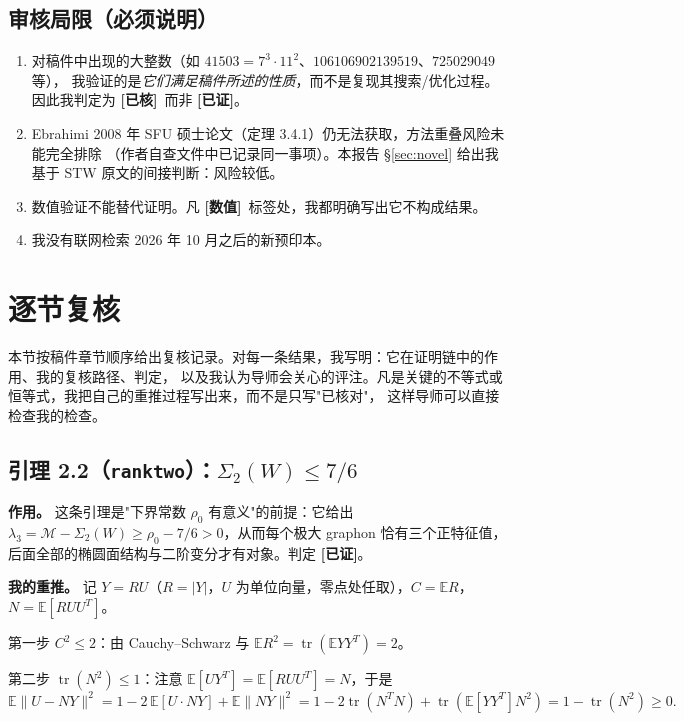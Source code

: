 \documentclass[UTF8,11pt]{ctexart}
\theoremstyle{definition}
\newcommand{\tr}{\operatorname{tr}}
\newcommand{\E}{\mathbb{E}}
\newcommand{\ok}{\textcolor[rgb]{0.05,0.45,0.15}{\bfseries [已证]}}
\newcommand{\chk}{\textcolor[rgb]{0.05,0.25,0.55}{\bfseries [已核]}}
\newcommand{\num}{\textcolor[rgb]{0.55,0.35,0.00}{\bfseries [数值]}}
\begin{document}
\subsection{审核局限（必须说明）}
\begin{enumerate}[leftmargin=1.8em,itemsep=2pt]
\item 对稿件中出现的大整数（如 $41503=7^3\cdot11^2$、$106106902139519$、$725029049$ 等），
我验证的是\emph{它们满足稿件所述的性质}，而不是复现其搜索/优化过程。因此我判定为 \chk\ 而非 \ok。
\item Ebrahimi 2008 年 SFU 硕士论文（定理 3.4.1）仍无法获取，方法重叠风险未能完全排除
（作者自查文件中已记录同一事项）。本报告 \S\ref{sec:novel} 给出我基于 STW 原文的间接判断：风险较低。
\item 数值验证不能替代证明。凡 \num\ 标签处，我都明确写出它不构成结果。
\item 我没有联网检索 2026 年 10 月之后的新预印本。
\end{enumerate}

\section{逐节复核}\label{sec:detail}

本节按稿件章节顺序给出复核记录。对每一条结果，我写明：它在证明链中的作用、我的复核路径、判定，
以及我认为导师会关心的评注。凡是关键的不等式或恒等式，我把自己的重推过程写出来，而不是只写"已核对"，
这样导师可以直接检查我的检查。

\subsection{引理 2.2（\texttt{ranktwo}）：$\Sigma_2(W)\le7/6$}

\textbf{作用。} 这条引理是"下界常数 $\rho_0$ 有意义"的前提：它给出
$\lambda_3=\mathcal M-\Sigma_2(W)\ge\rho_0-7/6>0$，从而每个极大 graphon 恰有三个正特征值，
后面全部的椭圆面结构与二阶变分才有对象。判定 \ok。

\textbf{我的重推。} 记 $Y=RU$（$R=|Y|$，$U$ 为单位向量，零点处任取），$C=\E R$，$N=\E[RUU^T]$。

第一步 $C^2\le2$：由 Cauchy--Schwarz 与 $\E R^2=\tr(\E YY^T)=2$。

第二步 $\tr(N^2)\le1$：注意 $\E[UY^T]=\E[RUU^T]=N$，于是
\[
 \E\|U-NY\|^2=1-2\,\E[U\cdot NY]+\E\|NY\|^2
            =1-2\tr(N^TN)+\tr(\E[YY^T]N^2)=1-\tr(N^2)\ge0 .
\]
\end{document}
